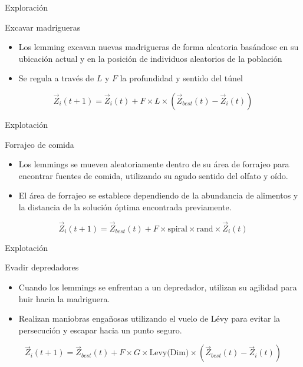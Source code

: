 \documentclass[12pt]{beamer}
\begin{document}
\begin{frame}{Exploración }
  \begin{block}{Excavar madrigueras}
      \justifying
      \begin{itemize}
          \item Los lemming excavan nuevas madrigueras de forma aleatoria basándose en su ubicación actual y en la posición de individuos aleatorios de la población
          \item Se regula a través de $L$ y $F$ la profundidad y sentido del túnel
      \end{itemize}
  \end{block}
  \begin{equation}
\vec{Z}_i(t+1) = \vec{Z}_i(t) + F \times L \times \left( \vec{Z}_{best}(t) - \vec{Z}_i(t) \right) \tag{9}
\end{equation}

\end{frame}

\begin{frame}{Explotación }
  \begin{block}{Forrajeo de comida}
      \justifying
      \begin{itemize}
          \item Los lemmings se mueven aleatoriamente dentro de su área de forrajeo para encontrar fuentes de comida, utilizando su agudo sentido del olfato y oído.
          \item El área de forrajeo se establece dependiendo de la abundancia de alimentos y la distancia de la solución óptima encontrada previamente.
      \end{itemize}
  \end{block}
  \begin{equation}
\vec{Z}_i(t+1) = \vec{Z}_{best}(t) + F \times \text{spiral} \times \text{rand} \times \vec{Z}_i(t)
\tag{11}
\end{equation}
\end{frame}

\begin{frame}{Explotación }
  \begin{block}{Evadir depredadores}
      \justifying
      \begin{itemize}
          \item Cuando los lemmings se enfrentan a un depredador, utilizan su agilidad para huir hacia la madriguera.
          \item Realizan maniobras engañosas utilizando el vuelo de Lévy para evitar la persecución y escapar hacia un punto seguro.
      \end{itemize}
  \end{block}
  \begin{equation}
\vec{Z}_i(t+1) = \vec{Z}_{best}(t) + F \times G \times \text{Levy(Dim)} \times \left( \vec{Z}_{best}(t) - \vec{Z}_i(t) \right)
\tag{14}
\end{equation}
\end{frame}
\end{document}
